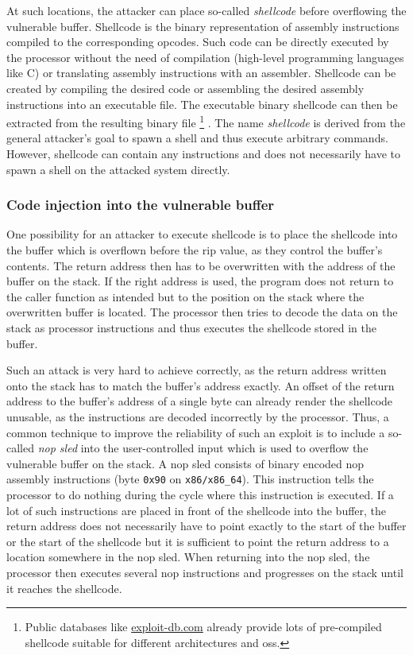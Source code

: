 At such locations, the attacker can place so-called \emph{shellcode} before overflowing the vulnerable buffer.
Shellcode is the binary representation of assembly instructions compiled to the corresponding \glspl{opcode}.
Such code can be directly executed by the processor without the need of compilation (high-level programming languages like C) or translating assembly instructions with an assembler.
Shellcode can be created by compiling the desired code or assembling the desired assembly instructions into an executable file.
The executable binary shellcode can then be extracted from the resulting binary file%
	\footnote{Public databases like \href{https://www.exploit-db.com/shellcodes}{exploit-db.com} already provide lots of pre-compiled shellcode suitable for different architectures and \glspl{os}.}%
.
The name \emph{shellcode} is derived from the general attacker's goal to spawn a shell and thus execute arbitrary commands.
However, shellcode can contain any instructions and does not necessarily have to spawn a shell on the attacked system directly.

\subsubsection{Code injection into the vulnerable buffer}
\label{subsubsec:ci-into-vuln-buffer}

One possibility for an attacker to execute shellcode is to place the shellcode into the buffer which is overflown before the \gls{rip} value, as they control the buffer's contents.
The return address then has to be overwritten with the address of the buffer on the stack.
If the right address is used, the program does not return to the caller function as intended but to the position on the stack where the overwritten buffer is located.
The processor then tries to decode the data on the stack as processor instructions and thus executes the shellcode stored in the buffer.

Such an attack is very hard to achieve correctly, as the return address written onto the stack has to match the buffer's address exactly.
An offset of the return address to the buffer's address of a single byte can already render the shellcode unusable, as the instructions are decoded incorrectly by the processor.
Thus, a common technique to improve the reliability of such an exploit is to include a so-called \emph{\gls{nop} sled} into the user-controlled input which is used to overflow the vulnerable buffer on the stack.
A \gls{nop} sled consists of binary encoded \acs{nop} assembly instructions (byte \texttt{0x90} on \texttt{x86/x86\_64}).
This instruction tells the processor to do nothing during the cycle where this instruction is executed.
If a lot of such instructions are placed in front of the shellcode into the buffer, the return address does not necessarily have to point exactly to the start of the buffer or the start of the shellcode but it is sufficient to point the return address to a location somewhere in the \acs{nop} sled.
When returning into the \acs{nop} sled, the processor then executes several \gls{nop} instructions and progresses on the stack until it reaches the shellcode.

